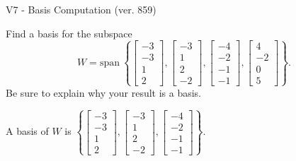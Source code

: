 \begin{exercise}
  \begin{exerciseTitle}V7 - Basis Computation (ver. 859)\end{exerciseTitle}
  \begin{exerciseStatement}
    Find a basis for the subspace 
\[W=\mathrm{span}\ \left\{\left[\begin{array}{r}
-3 \\
-3 \\
1 \\
2
\end{array}\right] , \left[\begin{array}{r}
-3 \\
1 \\
2 \\
-2
\end{array}\right] , \left[\begin{array}{r}
-4 \\
-2 \\
-1 \\
-1
\end{array}\right] , \left[\begin{array}{r}
4 \\
-2 \\
0 \\
5
\end{array}\right]\right\}.\]
 Be sure to explain why your result is a basis.


  \end{exerciseStatement}
  \begin{exerciseAnswer}
   A basis of \(W\) is  \(\left\{\left[\begin{array}{r}
-3 \\
-3 \\
1 \\
2
\end{array}\right] , \left[\begin{array}{r}
-3 \\
1 \\
2 \\
-2
\end{array}\right] , \left[\begin{array}{r}
-4 \\
-2 \\
-1 \\
-1
\end{array}\right]\right\}\).
  


  \end{exerciseAnswer}
\end{exercise}